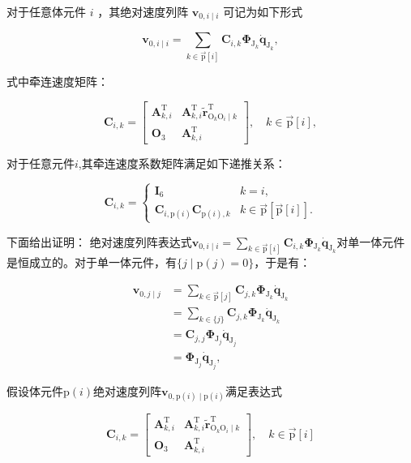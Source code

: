 对于任意体元件 $i$ ，其绝对速度列阵 $\boldsymbol{v}_{0, i \mid i}$  可记为如下形式

\[
\boldsymbol{v}_{0, i \mid i}=\sum_{k \in \overrightarrow{\mathrm{p}}[i]} \boldsymbol{C}_{i, k} \boldsymbol{\Phi}_{\mathrm{J}_{k}} \dot{\boldsymbol{q}}_{\mathrm{J}_{k}},
\]

式中牵连速度矩阵：

\[
\boldsymbol{C}_{i, k}=\left[\begin{array}{cc}
\boldsymbol{A}_{k, i}^{\mathrm{T}} & \boldsymbol{A}_{k, i}^{\mathrm{T}} \tilde{\boldsymbol{r}}_{\mathrm{O}_{k} \mathrm{O}_{i} \mid k}^{\mathrm{T}} \\
\boldsymbol{O}_{3} & \boldsymbol{A}_{k, i}^{\mathrm{T}}
\end{array}\right], \quad k \in \overrightarrow{\mathrm{p}}[i],
\]

对于任意元件$i$,其牵连速度系数矩阵满足如下递推关系：

\[
\boldsymbol{C}_{i, k}=\left\{\begin{array}{ll}
\boldsymbol{I}_{6} & k=i, \\
\boldsymbol{C}_{i, \mathrm{p}(i)} \boldsymbol{C}_{\mathrm{p}(i), k} & k \in \overrightarrow{\mathrm{p}}[\overrightarrow{\mathrm{p}}[i]] .
\end{array}\right.
\]

下面给出证明： 绝对速度列阵表达式$\boldsymbol{v}_{0, i \mid i}=\sum_{k \in \overrightarrow{\mathrm{p}}[i]} \boldsymbol{C}_{i, k} \boldsymbol{\Phi}_{\mathrm{J}_{k}} \dot{\boldsymbol{q}}_{\mathrm{J}_{k}}$对单一体元件是恒成立的。对于单一体元件，有$\{j\mid \mathrm{p}(j)=0\}$，于是有：

\[
\begin{aligned}
\boldsymbol{v}_{0, j \mid j} & =\sum_{k \in \overrightarrow{\mathrm{p}}[j]} \boldsymbol{C}_{j, k} \boldsymbol{\Phi}_{\mathrm{J}_{k}} \dot{\boldsymbol{q}}_{\mathrm{J}_{k}} \\
& =\sum_{k \in\{j\}} \boldsymbol{C}_{j, k} \boldsymbol{\Phi}_{\mathrm{J}_{k}} \dot{\boldsymbol{q}}_{\mathrm{J}_{k}} \\
& =\boldsymbol{C}_{j, j} \boldsymbol{\Phi}_{\mathrm{J}_{j}} \dot{\boldsymbol{q}}_{\mathrm{J}_{j}} \\
& =\boldsymbol{\Phi}_{\mathrm{J}_{j}} \dot{\boldsymbol{q}}_{\mathrm{J}_{j}},
\end{aligned}
\]

假设体元件$\mathrm{p}(i)$绝对速度列阵$\boldsymbol{v}_{0,\mathrm{p}(i)\mid \mathrm{p}(i)}$满足表达式

\[
\boldsymbol{C}_{i, k}=\left[\begin{array}{cc}
\boldsymbol{A}_{k, i}^{\mathrm{T}} & \boldsymbol{A}_{k, i}^{\mathrm{T}} \tilde{\boldsymbol{r}}_{\mathrm{O}_{k} \mathrm{O}_{i} \mid k}^{\mathrm{T}} \\
\boldsymbol{O}_{3} & \boldsymbol{A}_{k, i}^{\mathrm{T}}
\end{array}\right], \quad k \in \overrightarrow{\mathrm{p}}[i]
\]

